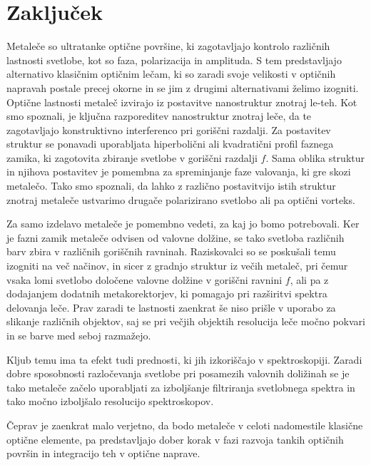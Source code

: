 \documentclass[12pt ]{article}
\begin{document}
\section{Zaključek}
Metaleče so ultratanke optične površine, ki zagotavljajo kontrolo različnih lastnosti svetlobe, kot so faza, polarizacija in amplituda. S tem predstavljajo alternativo klasičnim optičnim lečam, ki so zaradi svoje velikosti v optičnih napravah postale precej okorne in se jim z drugimi alternativami želimo izogniti. Optične lastnosti metaleč izvirajo iz postavitve nanostruktur znotraj le-teh. Kot smo spoznali, je ključna razporeditev nanostruktur znotraj leče, da te zagotavljajo konstruktivno interferenco pri goriščni razdalji. Za postavitev struktur se ponavadi uporabljata hiperbolični ali kvadratični profil faznega zamika, ki zagotovita zbiranje svetlobe v goriščni razdalji $f$. Sama oblika struktur in njihova postavitev je pomembna za spreminjanje faze valovanja, ki gre skozi metalečo. Tako smo spoznali, da lahko z različno postavitvijo istih struktur znotraj metaleče ustvarimo drugače polarizirano svetlobo ali pa optični vorteks. 


Za samo izdelavo metaleče je pomembno vedeti, za kaj jo bomo potrebovali. Ker je fazni zamik metaleče odvisen od valovne dolžine, se tako svetloba različnih barv zbira v različnih goriščnih ravninah. Raziskovalci so se poskušali temu izogniti na več načinov, in sicer z gradnjo struktur iz večih metaleč, pri čemur vsaka lomi svetlobo določene valovne dolžine v goriščni ravnini $f$, ali pa z dodajanjem dodatnih metakorektorjev, ki pomagajo pri razširitvi spektra delovanja leče. Prav zaradi te lastnosti zaenkrat še niso prišle v uporabo za slikanje različnih objektov, saj se pri večjih objektih resolucija leče močno pokvari in se barve med seboj razmažejo. 

Kljub temu ima ta efekt tudi prednosti, ki jih izkoriščajo v spektroskopiji. Zaradi dobre sposobnosti razločevanja svetlobe pri posamezih valovnih doližinah se je tako metaleče začelo uporabljati za izboljšanje filtriranja svetlobnega spektra in tako močno izboljšalo resolucijo spektroskopov.  

Čeprav je zaenkrat malo verjetno, da bodo metaleče v celoti nadomestile klasične optične elemente, pa predstavljajo dober korak v fazi razvoja tankih optičnih površin in integracijo teh v optične naprave.


\printbibliography
\end{document}
